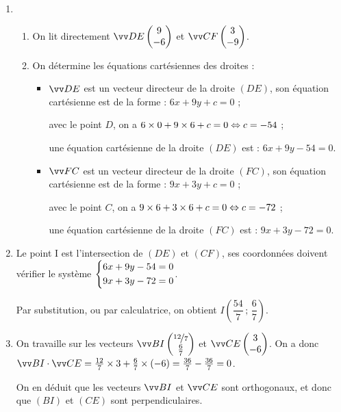 \documentclass[a4paper,11pt]{article}
\begin{document}
\begin{enumerate}
	\item 
	\begin{enumerate}
		\item On lit directement $\vect{DE} \begin{pmatrix} 9\\-6 \end{pmatrix}$ et $\vect{CF} \begin{pmatrix} 3\\-9 \end{pmatrix}$.
		\item On détermine les équations cartésiennes des droites :
		
		\begin{itemize}[leftmargin=*]
			\item $\vect{DE}$ est un vecteur directeur de la droite $(DE)$, son équation cartésienne est de la forme : $6x + 9y + c = 0$ ;
			
			avec le point $D$, on a $6\times0 + 9\times6 + c = 0 \Leftrightarrow c = -54$ ;
			
			une équation cartésienne de la droite $(DE)$ est : $6x + 9y - 54 = 0$.
			\item $\vect{FC}$ est un vecteur directeur de la droite $(FC)$, son équation cartésienne est de la forme : $9x + 3y + c = 0$ ;
			
			avec le point $C$, on a $9\times6 + 3\times6 + c = 0 \Leftrightarrow c = -72$ ;
			
			une équation cartésienne de la droite $(FC)$ est : $9x + 3y - 72 = 0$.
		\end{itemize}
	\end{enumerate}
	\item Le point I est l’intersection de $(DE)$ et $(CF)$, ses coordonnées doivent vérifier le système $\begin{dcases} 6x + 9y - 54 = 0 \\ 9x + 3y - 72 = 0 \end{dcases}$.
	
	Par substitution, ou par calculatrice, on obtient $I \left( \dfrac{54}{7}\,;\,\dfrac{6}{7} \right)$.
	\item On travaille sur les vecteurs $\vect{BI} \begin{pmatrix} \nicefrac{12}{7} \\ \tfrac{6}{7} \end{pmatrix}$ et $\vect{CE} \begin{pmatrix} 3\\-6 \end{pmatrix}$. On a donc $\vect{BI}\cdot\vect{CE} = \frac{12}{7}\times3+\frac{6}{7}\times(-6)=\frac{36}{7}-\frac{36}{7}=0$.
	
	On en déduit que les vecteurs $\vect{BI}$ et $\vect{CE}$ sont orthogonaux, et donc que $(BI)$ et $(CE)$ sont perpendiculaires.
\end{enumerate}
\end{document}
